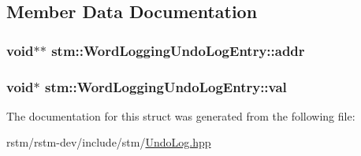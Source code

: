 \subsection{Member Data Documentation}
\hypertarget{structstm_1_1WordLoggingUndoLogEntry_a5317c0c928e583bb016149d19cc65443}{
\subsubsection[{addr}]{\setlength{\rightskip}{0pt plus 5cm}void$\ast$$\ast$ stm\-::\-Word\-Logging\-Undo\-Log\-Entry\-::addr}}\label{structstm_1_1WordLoggingUndoLogEntry_a5317c0c928e583bb016149d19cc65443}
\hypertarget{structstm_1_1WordLoggingUndoLogEntry_aa023a8d6d15f6b109aef96ac78a03469}{
\subsubsection[{val}]{\setlength{\rightskip}{0pt plus 5cm}void$\ast$ stm\-::\-Word\-Logging\-Undo\-Log\-Entry\-::val}}\label{structstm_1_1WordLoggingUndoLogEntry_aa023a8d6d15f6b109aef96ac78a03469}


The documentation for this struct was generated from the following file\-:\begin{DoxyCompactItemize}
\item 
rstm/rstm-\/dev/include/stm/\hyperlink{UndoLog_8hpp}{Undo\-Log.\-hpp}\end{DoxyCompactItemize}
